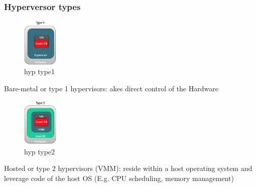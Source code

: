 \documentclass[10pt, oneside]{article}
\begin{document}
\subsubsection*{Hyperversor types}
\begin{multicols}{4}
    \begin{figure}[H]
        \begin{center}
        \includegraphics[width=0.15\textwidth]{img/img38.png}
        \caption{hyp type1}
        \label{fig:type1}
        \end{center}
    \end{figure}
    \columnbreak
    \noindent
    Bare-metal or type 1 hypervisors: akes direct control of the Hardware
    \columnbreak
    \begin{figure}[H]
        \begin{center}
        \includegraphics[width=0.15\textwidth]{img/img39.png}
        \caption{hyp type2}
        \label{fig:type2}
        \end{center}
    \end{figure}
    \columnbreak
    \noindent
    Hosted or type 2 hypervisors (VMM): reside within a host operating system and leverage code of the host OS (E.g. CPU scheduling, memory management)
\end{multicols}
\end{document}
